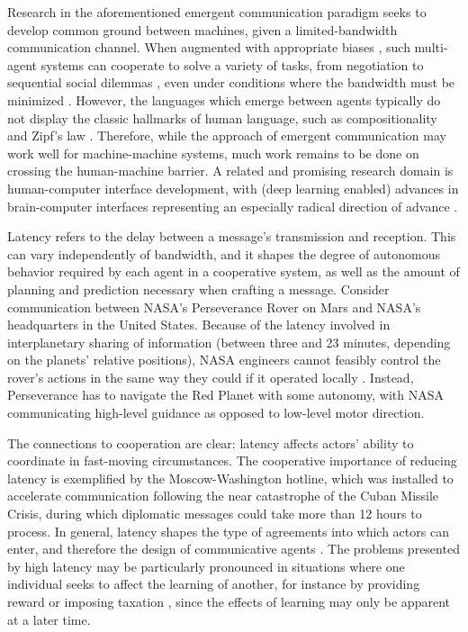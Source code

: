\documentclass[11pt, a4paper, logo, onecolumn, nonumbering]{deepmind}
\begin{document}
Research in the aforementioned emergent communication paradigm seeks to develop common ground between machines, given a limited-bandwidth communication channel. When augmented with appropriate biases \cite{eccles2019biases}, such multi-agent systems can cooperate to solve a variety of tasks, from negotiation \cite{DBLP:journals/corr/abs-1804-03980} to sequential social dilemmas \cite{DBLP:journals/corr/abs-1810-08647}, even under conditions where the bandwidth must be minimized \cite{mao2020learning}. However, the languages which emerge between agents typically do not display the classic hallmarks of human language, such as compositionality and Zipf's law \cite{kottur2017natural, DBLP:journals/corr/abs-1905-12561, lazaridou2018emergence}. Therefore, while the approach of emergent communication may work well for machine-machine systems, much work remains to be done on crossing the human-machine barrier. A related and promising research domain is human-computer interface development, with (deep learning enabled) advances in brain-computer interfaces representing an especially radical direction of advance  \cite{zhang2019survey}.

Latency refers to the delay between a message's transmission and reception. This can vary independently of bandwidth, and it shapes the degree of autonomous behavior required by each agent in a cooperative system, as well as the amount of planning and prediction necessary when crafting a message. 
Consider communication between NASA's Perseverance Rover on Mars and NASA's headquarters in the United States. Because of the latency involved in interplanetary sharing of information (between three and 23 minutes, depending on the planets' relative positions), NASA engineers cannot feasibly control the rover's actions in the same way they could if it operated locally \cite{Beaton2017Extravehicular}. Instead, Perseverance has to navigate the Red Planet with some autonomy, 
with NASA communicating high-level guidance as opposed to low-level motor direction.

The connections to cooperation are clear: latency affects actors' ability to coordinate in fast-moving circumstances. %
The cooperative importance of reducing latency is exemplified by the Moscow-Washington hotline, which was installed to accelerate communication following the near catastrophe of the Cuban Missile Crisis, during which diplomatic messages could take more than 12 hours to process.     
In general, latency shapes the type of agreements into which actors can enter, and therefore the design of communicative agents \cite{blake2003, chen2020delayaware}. The problems presented by high latency may be particularly pronounced in situations where one individual seeks to affect the learning of another, for instance by providing reward \cite{yang2020learning, lupu2020gifting} or imposing taxation \cite{zheng2020ai}, since the effects of learning may only be apparent at a later time. 
\end{document}
